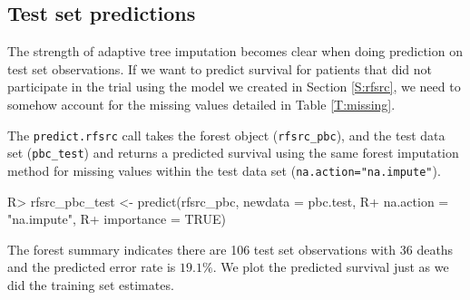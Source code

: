 \documentclass[article]{jss}
\begin{document}
\subsection{Test set predictions}\label{test-set-predictions}

The strength of adaptive tree imputation becomes clear when doing
prediction on test set observations. If we want to predict survival for
patients that did not participate in the trial using the model we
created in Section \ref{S:rfsrc}, we need to somehow account for the
missing values detailed in Table \ref{T:missing}.

The \texttt{predict.rfsrc} call takes the forest object
(\texttt{rfsrc\_pbc}), and the test data set (\texttt{pbc\_test}) and
returns a predicted survival using the same forest imputation method for
missing values within the test data set
(\texttt{na.action="na.impute"}).

\begin{Schunk}
\begin{Sinput}
R> rfsrc_pbc_test <- predict(rfsrc_pbc, newdata = pbc.test,
R+                           na.action = "na.impute",
R+                           importance = TRUE)
\end{Sinput}
\end{Schunk}

The forest summary indicates there are 106 test set observations with 36
deaths and the predicted error rate is \(19.1\%\). We plot the predicted
survival just as we did the training set estimates.
\end{document}
